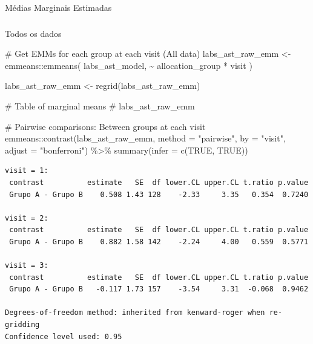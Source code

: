 \documentclass[
  12pt,
]{article}
\makeatletter
\let\oldparagraph\paragraph
\renewcommand{\paragraph}{
    \@ifstar
      \xxxParagraphStar
      \xxxParagraphNoStar
  }
\newcommand{\xxxParagraphStar}[1]{\oldparagraph*{#1}\mbox{}}
\newcommand{\xxxParagraphNoStar}[1]{\oldparagraph{#1}\mbox{}}
\let\oldsubparagraph\subparagraph
\renewcommand{\subparagraph}{
    \@ifstar
      \xxxSubParagraphStar
      \xxxSubParagraphNoStar
  }
\newcommand{\xxxSubParagraphStar}[1]{\oldsubparagraph*{#1}\mbox{}}
\newcommand{\xxxSubParagraphNoStar}[1]{\oldsubparagraph{#1}\mbox{}}
\newenvironment{Shaded}{\begin{snugshade}}{\end{snugshade}}
\newcommand{\AttributeTok}[1]{\textcolor[rgb]{0.40,0.45,0.13}{#1}}
\newcommand{\CommentTok}[1]{\textcolor[rgb]{0.37,0.37,0.37}{#1}}
\newcommand{\ConstantTok}[1]{\textcolor[rgb]{0.56,0.35,0.01}{#1}}
\newcommand{\FunctionTok}[1]{\textcolor[rgb]{0.28,0.35,0.67}{#1}}
\newcommand{\NormalTok}[1]{\textcolor[rgb]{0.00,0.23,0.31}{#1}}
\newcommand{\OtherTok}[1]{\textcolor[rgb]{0.00,0.23,0.31}{#1}}
\newcommand{\SpecialCharTok}[1]{\textcolor[rgb]{0.37,0.37,0.37}{#1}}
\newcommand{\StringTok}[1]{\textcolor[rgb]{0.13,0.47,0.30}{#1}}
\makeatother
\begin{document}
\paragraph{Médias Marginais
Estimadas}\label{muxe9dias-marginais-estimadas}

\subparagraph{Todos os dados}\label{todos-os-dados}

\begin{Shaded}
\begin{Highlighting}[]
\CommentTok{\# Get EMMs for each group at each visit (All data)}
\NormalTok{labs\_ast\_raw\_emm }\OtherTok{\textless{}{-}}\NormalTok{ emmeans}\SpecialCharTok{::}\FunctionTok{emmeans}\NormalTok{(}
\NormalTok{    labs\_ast\_model, }
    \SpecialCharTok{\textasciitilde{}}\NormalTok{ allocation\_group }\SpecialCharTok{*}\NormalTok{ visit}
\NormalTok{)}

\NormalTok{labs\_ast\_raw\_emm }\OtherTok{\textless{}{-}} \FunctionTok{regrid}\NormalTok{(labs\_ast\_raw\_emm)}

\CommentTok{\# Table of marginal means}
\CommentTok{\# labs\_ast\_raw\_emm}

\CommentTok{\# Pairwise comparisons: Between groups at each visit}
\NormalTok{emmeans}\SpecialCharTok{::}\FunctionTok{contrast}\NormalTok{(labs\_ast\_raw\_emm,}
\AttributeTok{method =} \StringTok{"pairwise"}\NormalTok{, }\AttributeTok{by =} \StringTok{"visit"}\NormalTok{,}
\AttributeTok{adjust =} \StringTok{"bonferroni"}\NormalTok{) }\SpecialCharTok{\%\textgreater{}\%} \FunctionTok{summary}\NormalTok{(}\AttributeTok{infer =} \FunctionTok{c}\NormalTok{(}\ConstantTok{TRUE}\NormalTok{, }\ConstantTok{TRUE}\NormalTok{))}
\end{Highlighting}
\end{Shaded}

\begin{verbatim}
visit = 1:
 contrast          estimate   SE  df lower.CL upper.CL t.ratio p.value
 Grupo A - Grupo B    0.508 1.43 128    -2.33     3.35   0.354  0.7240

visit = 2:
 contrast          estimate   SE  df lower.CL upper.CL t.ratio p.value
 Grupo A - Grupo B    0.882 1.58 142    -2.24     4.00   0.559  0.5771

visit = 3:
 contrast          estimate   SE  df lower.CL upper.CL t.ratio p.value
 Grupo A - Grupo B   -0.117 1.73 157    -3.54     3.31  -0.068  0.9462

Degrees-of-freedom method: inherited from kenward-roger when re-gridding 
Confidence level used: 0.95 
\end{verbatim}
\end{document}
